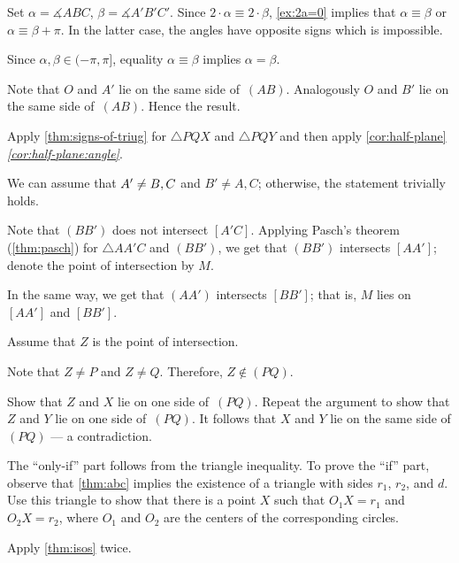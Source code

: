 \begin{multicols}{2}
Set $\alpha=\measuredangle ABC$, $\beta=\measuredangle A'B'C'$.
Since $2\cdot\alpha\equiv 2\cdot \beta$, \ref{ex:2a=0} implies that
 $\alpha\equiv \beta$ or $\alpha\equiv \beta+\pi$.
In the latter case, the angles have opposite signs which is impossible.

Since $\alpha,\beta\in(-\pi,\pi]$, equality $\alpha\equiv \beta$ implies $\alpha= \beta$.

Note that $O$ and $A'$
lie on the same side of~$(AB)$.
Analogously $O$ and $B'$
lie on the same side of~$(AB)$.
Hence the result.

Apply \ref{thm:signs-of-triug} for $\triangle PQX$ and $\triangle PQY$ and then 
apply \ref{cor:half-plane}\textit{\ref{cor:half-plane:angle}}.

We can assume that $A'\z\ne B,C$ and $B'\ne A, C$;
otherwise, the statement trivially holds.

Note that $(BB')$ does not intersect $[A'C]$.
Applying Pasch's theorem (\ref{thm:pasch}) for $\triangle AA'C$ and $(BB')$, we get that 
$(BB')$ intersects $[AA']$; denote the point of intersection by $M$.

In the same way, we get that $(AA')$ intersects $[BB']$;
that is, $M$ lies on $[AA']$ and $[BB']$.

Assume that $Z$ is the point of intersection.

Note that $Z\ne P$ and $Z\ne Q$.
Therefore, $Z\notin (PQ)$.

Show that $Z$ and $X$ lie on one side of~$(PQ)$.
Repeat the argument to show that $Z$ and $Y$ lie on one side of~$(PQ)$.
It follows that $X$ and $Y$ lie on the same side of $(PQ)$ --- a contradiction.

 The ``only-if'' part follows from the triangle inequality.
To prove the ``if'' part,  
observe that \ref{thm:abc} implies the existence of a triangle with sides $r_1$, $r_2$, and $d$.
Use this triangle to show that there is a point $X$ such that $O_1X=r_1$ and $O_2X=r_2$, where $O_1$ and $O_2$ are the centers of the corresponding circles.

\setcounter{eqtn}{0}

Apply \ref{thm:isos} twice.


\end{multicols}
